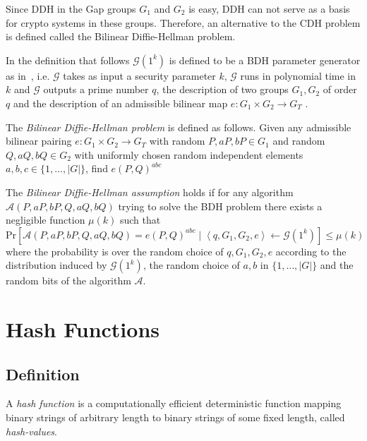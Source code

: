 Since DDH in the Gap groups $G_1$ and $G_2$ is easy, DDH can not serve as a basis for crypto systems in these groups. Therefore, an alternative to the CDH problem is defined called the Bilinear Diffie-Hellman problem.

In the definition that follows $\mathcal{G} \left( 1^k \right)$ is defined to be a BDH parameter generator as in~\cite{art:BonehF01}, i.e. $\mathcal{G}$ takes as input a security parameter $k$, $\mathcal{G}$ runs in polynomial time in $k$ and $\mathcal{G}$ outputs a prime number $q$, the description of two groups $G_1, G_2$ of order $q$ and the description of an admissible bilinear map $e: G_1 \times G_2 \rightarrow G_T$ .
\begin{defn}[BDH]
\label{def:bdh}
The \textit{Bilinear Diffie-Hellman problem} is defined as follows. Given any admissible bilinear pairing $e: G_1 \times G_2 \rightarrow G_T$ with random $P, aP, bP \in G_1$ and random $Q, aQ, bQ \in G_2$ with uniformly chosen random independent elements $a, b, c \in \{ 1, \ldots, | G |\}$, find $e \left( P, Q \right)^{abc}$

The \textit{Bilinear Diffie-Hellman assumption} holds if for any algorithm \\ $\mathcal{A} \left( P, aP, bP, Q, aQ, bQ \right)$ trying to solve the BDH problem there exists a negligible function $\mu \left( k \right)$ such that 
 \begin{equation*}
  \textrm{Pr} \left[ \mathcal{A} \left( P, aP, bP, Q, aQ, bQ \right) = e \left( P, Q \right)^{abc} \mid \left< q, G_1, G_2, e \right> \leftarrow \mathcal{G} \left( 1^{k} \right)\right] \leq \mu \left( k \right)
 \end{equation*}
 where the probability is over the random choice of $q, G_1, G_2, e$ according to the distribution induced by $\mathcal{G} \left( 1^k \right)$, the random choice of $a, b$ in $\{ 1, \ldots, | G |\}$ and the random bits of the algorithm $\mathcal{A}$.
\end{defn}

\section{Hash Functions}
\label{sec:hash_functions}
\subsection{Definition}
A \textit{hash function} is a computationally efficient deterministic function mapping binary strings of arbitrary length to binary strings of some fixed length, called \textit{hash-values}.

